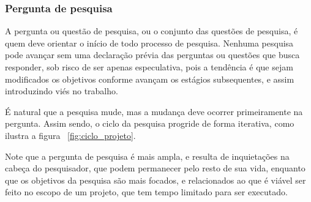 \subsubsection{Pergunta de pesquisa}
A pergunta ou questão de pesquisa, ou o conjunto das questões de pesquisa, é quem deve orientar o início de todo processo de pesquisa. Nenhuma pesquisa pode avançar sem uma declaração prévia das perguntas ou questões que busca responder, sob risco de ser apenas especulativa, pois a tendência é que sejam modificados os objetivos conforme avançam os estágios subsequentes, e assim introduzindo viés no trabalho.


É natural que a pesquisa mude, mas a mudança deve ocorrer primeiramente na pergunta. Assim sendo, o ciclo da pesquisa progride de forma iterativa, como ilustra a figura ~\ref{fig:ciclo_projeto}.

Note que a pergunta de pesquisa é mais ampla, e resulta de inquietações na cabeça do pesquisador, que podem permanecer pelo resto de sua vida, enquanto que os objetivos da pesquisa são mais focados, e relacionados ao que é viável ser feito no escopo de um projeto, que tem tempo limitado para ser executado.

